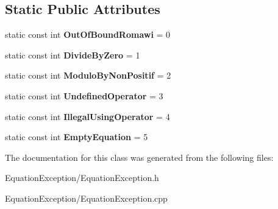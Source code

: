 \subsection*{Static Public Attributes}
\begin{DoxyCompactItemize}
\item 
\hypertarget{class_equation_exception_ae01ec39f2795669551c6e9c780c9befa}{}static const int {\bfseries Out\+Of\+Bound\+Romawi} = 0\label{class_equation_exception_ae01ec39f2795669551c6e9c780c9befa}

\item 
\hypertarget{class_equation_exception_a5c3aa3b5efcb230cb72ab97fa8ba9b57}{}static const int {\bfseries Divide\+By\+Zero} = 1\label{class_equation_exception_a5c3aa3b5efcb230cb72ab97fa8ba9b57}

\item 
\hypertarget{class_equation_exception_aa685b474487c140e4f7b39b328ab8043}{}static const int {\bfseries Modulo\+By\+Non\+Positif} = 2\label{class_equation_exception_aa685b474487c140e4f7b39b328ab8043}

\item 
\hypertarget{class_equation_exception_a31ce87bcca07a6f5495ccb0ad38b03a9}{}static const int {\bfseries Undefined\+Operator} = 3\label{class_equation_exception_a31ce87bcca07a6f5495ccb0ad38b03a9}

\item 
\hypertarget{class_equation_exception_ac0bd8b25068211c372f0bb1939283076}{}static const int {\bfseries Illegal\+Using\+Operator} = 4\label{class_equation_exception_ac0bd8b25068211c372f0bb1939283076}

\item 
\hypertarget{class_equation_exception_a7366915be3f48995b0f43fb22db905d5}{}static const int {\bfseries Empty\+Equation} = 5\label{class_equation_exception_a7366915be3f48995b0f43fb22db905d5}

\end{DoxyCompactItemize}


The documentation for this class was generated from the following files\+:\begin{DoxyCompactItemize}
\item 
Equation\+Exception/Equation\+Exception.\+h\item 
Equation\+Exception/Equation\+Exception.\+cpp\end{DoxyCompactItemize}
